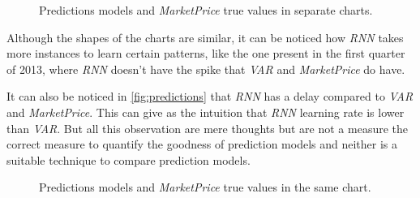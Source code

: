 \begin{figure}[bth] 
  \caption{Predictions models and \textit{MarketPrice} true values in
separate charts.}
  \label{fig:predictions-subplots}
\end{figure}

Although the shapes of the charts are similar, it can be noticed how
\textit{RNN} takes more instances to learn certain patterns, like the
one present in the first quarter of 2013, where \textit{RNN} doesn't
have the spike that \textit{VAR} and \textit{MarketPrice} do have.

It can also be noticed in \autoref{fig:predictions} that \textit{RNN}
has a delay compared to \textit{VAR} and \textit{MarketPrice}. This
can give as the intuition that \textit{RNN} learning rate is lower
than \textit{VAR}. But all this observation are mere thoughts but are
not a measure the correct measure to quantify the goodness of
prediction models and neither is a suitable technique to compare
prediction models.

\begin{figure}[bth]
  \caption{Predictions models and \textit{MarketPrice} true values in
    the same chart.}
  \label{fig:predictions}
\end{figure}

